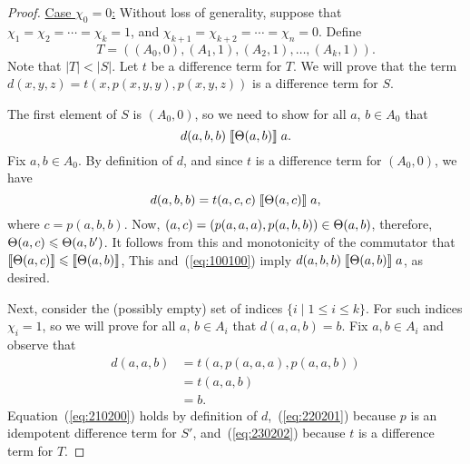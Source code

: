 \begin{proof}
\vskip3mm

\noindent \underline{Case $\chi_0 = 0$:}
Without loss of generality, suppose that
$\chi_1 = \chi_2 = \cdots =\chi_k = 1$,
and
$\chi_{k+1} = \chi_{k+2} = \cdots = \chi_{n} = 0$.
Define
\[
T = ((A_0, 0), (A_1, 1), (A_2, 1), \dots, (A_k, 1)).
\]
Note that $|T| < |S|$.
Let $t$ be a \glocal difference term for $T$.
We will prove that the term $d(x,y,z) = t(x, p(x,y,y), p(x,y,z))$
is a \glocal difference term for $S$.

The first element of $S$ is $(A_0, 0)$, so we need to show for all $a$, $b \in A_0$
that
\[
d(a,b,b) \mathrel{\llbracket \Theta(a,b) \rrbracket} a.
\]
Fix $a, b \in A_0$.
By definition of $d$, and since
$t$ is a \glocal difference term for $(A_0, 0)$, we have
\begin{equation}
  \label{eq:100100}
  d(a,b,b) 
  =t(a, c, c)\comr{\Cg(a, c)} a,
\end{equation}
where $c = p(a,b,b)$.
Now, $(a, c) = (p(a,a,a), p(a,b,b)) \in \Theta(a, b)$, therefore,
$\Theta(a, c) \leqslant \Theta(a,b')$.
It follows from this and monotonicity of the commutator that
$\llbracket \Theta(a, c) \rrbracket \leqslant \llbracket \Theta(a,b) \rrbracket$,
This and~(\ref{eq:100100}) imply
$d(a,b,b)\mathrel{\llbracket \Theta(a,b) \rrbracket} a$,
as desired.

Next, consider the (possibly empty) set of indices $\{i \mid 1\leq i \leq k\}$.
For such indices $\chi_i =1$, so we will prove
for all $a$, $b \in A_i$ that $d(a,a,b) = b$.
Fix $a, b \in A_i$ and observe that
\begin{align}
  d(a,a,b) &=
  t(a, p(a,a,a), p(a,a,b)) \label{eq:210200}\\
  &=t(a,a,b) \label{eq:220201}\\
  &=b. \label{eq:230202}
\end{align}
Equation~(\ref{eq:210200}) holds by definition of $d$,~(\ref{eq:220201})
because $p$ is an idempotent \glocal difference term for
$S'$, and~(\ref{eq:230202}) because $t$ is a \glocal difference term for $T$.


\end{proof}
